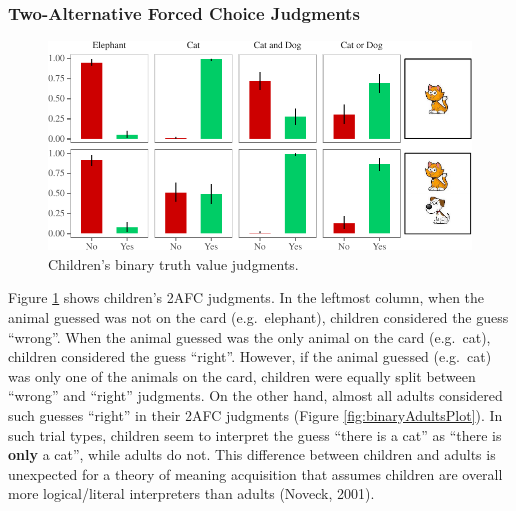 \documentclass[oneside]{report}
\theoremstyle{definition}
\theoremstyle{definition}
\theoremstyle{definition}
\theoremstyle{remark}
\begin{document}
\subsubsection{Two-Alternative Forced Choice
Judgments}\label{two-alternative-forced-choice-judgments}
\begin{figure}[t]

{\centering \includegraphics{figs/Study3tvjtPlot-1} 

}

\caption{Children's binary truth value judgments.}\label{fig:Study3tvjtPlot}
\end{figure}
Figure \ref{fig:Study3tvjtPlot} shows children's 2AFC judgments. In the
leftmost column, when the animal guessed was not on the card
(e.g.~elephant), children considered the guess ``wrong''. When the
animal guessed was the only animal on the card (e.g.~cat), children
considered the guess ``right''. However, if the animal guessed
(e.g.~cat) was only one of the animals on the card, children were
equally split between ``wrong'' and ``right'' judgments. On the other
hand, almost all adults considered such guesses ``right'' in their 2AFC
judgments (Figure \ref{fig:binaryAdultsPlot}). In such trial types,
children seem to interpret the guess ``there is a cat'' as ``there is
\textbf{only} a cat'', while adults do not. This difference between
children and adults is unexpected for a theory of meaning acquisition
that assumes children are overall more logical/literal interpreters than
adults (Noveck, 2001).
\end{document}
